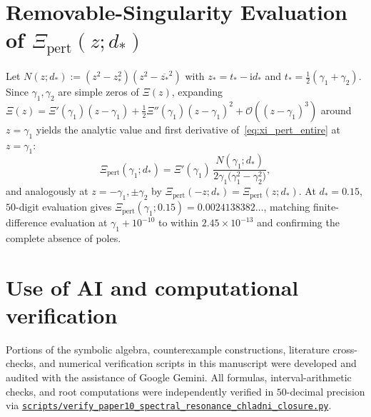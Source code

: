 \documentclass[11pt,reqno]{amsart}
\theoremstyle{plain}
\theoremstyle{definition}
\theoremstyle{remark}
\numberwithin{equation}{section}
\newcommand{\ii}{\mathrm{i}}
\begin{document}
\appendix

\section{Removable-Singularity Evaluation of $\Xi_{\mathrm{pert}}(z; d_*)$}\label{app:pert}

Let $N(z; d_*) := (z^2 - z_*^2)(z^2 - \overline{z_*}^2)$ with $z_* = t_* - \ii d_*$ and $t_* = \frac{1}{2}(\gamma_1 + \gamma_2)$. Since $\gamma_1, \gamma_2$ are simple zeros of $\Xi(z)$, expanding $\Xi(z) = \Xi'(\gamma_1)(z - \gamma_1) + \frac{1}{2}\Xi''(\gamma_1)(z - \gamma_1)^2 + \mathcal{O}((z - \gamma_1)^3)$ around $z = \gamma_1$ yields the analytic value and first derivative of~\eqref{eq:xi_pert_entire} at $z = \gamma_1$:
\begin{equation}\label{eq:removable_limit}
\Xi_{\mathrm{pert}}(\gamma_1; d_*) = \Xi'(\gamma_1)\,\frac{N(\gamma_1; d_*)}{2\gamma_1\bigl(\gamma_1^2 - \gamma_2^2\bigr)},
\end{equation}
and analogously at $z = -\gamma_1, \pm\gamma_2$ by $\Xi_{\mathrm{pert}}(-z; d_*) = \Xi_{\mathrm{pert}}(z; d_*)$. At $d_* = 0.15$, $50$-digit evaluation gives $\Xi_{\mathrm{pert}}(\gamma_1; 0.15) = 0.0024138382\dots$, matching finite-difference evaluation at $\gamma_1 + 10^{-10}$ to within $2.45 \times 10^{-13}$ and confirming the complete absence of poles.

\section*{Use of AI and computational verification}

Portions of the symbolic algebra, counterexample constructions, literature cross-checks, and numerical verification scripts in this manuscript were developed and audited with the assistance of Google Gemini. All formulas, interval-arithmetic checks, and root computations were independently verified in $50$-decimal precision via \href{https://github.com/thijsmissiaen/paper10-spectral-resonance-chladni-closure/blob/main/scripts/verify_paper10_spectral_resonance_chladni_closure.py}{\texttt{scripts/verify\_\allowbreak paper10\_\allowbreak spectral\_\allowbreak resonance\_\allowbreak chladni\_\allowbreak closure.py}}.
\end{document}
